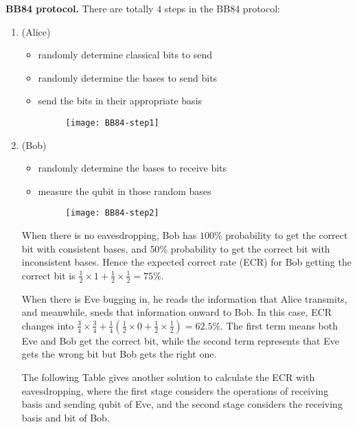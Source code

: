 \documentclass{easyclass}
\begin{document}
\textbf{BB84 protocol.} There are totally $4$ steps in the BB84 protocol:
\begin{enumerate}
	\item (Alice)
		\begin{itemize}
			\item randomly determine classical bits to send
			\item randomly determine the bases to send bits
			\item send the bits in their appropriate basis
			\begin{figure}[h]
				\centering
				\texttt{[image: BB84-step1]}
				\label{fig:BB84-step1}
			\end{figure}
		\end{itemize}
	\item (Bob)
		\begin{itemize}
			\item randomly determine the bases to receive bits
			\item measure the qubit in those random bases 
			\begin{figure}[h]
				\centering
				\texttt{[image: BB84-step2]}
				\label{fig:BB84-step2}
			\end{figure}
		\end{itemize}
		
		When there is no eavesdropping, Bob has $100\%$ probability to get the correct bit with consistent bases, and $50\%$ probability to get the correct bit with inconsistent bases. Hence the expected correct rate (ECR) for Bob getting the correct bit is $\frac{1}{2}\times 1+\frac{1}{2}\times\frac{1}{2}=75\%$.
		
		When there is Eve bugging in, he reads the information that Alice transmits, and meanwhile, sneds that information onward to Bob. In this case, ECR changes into $\frac{3}{4}\times \frac{3}{4}+\frac{1}{4}(\frac{1}{2}\times 0+\frac{1}{2}\times\frac{1}{2})=62.5\%$. The first term means both Eve and Bob get the correct bit, while the second term represents that Eve gets the wrong bit but Bob gets the right one. %

	    The following Table gives another solution to calculate the ECR with eavesdropping, where the first stage considers the operations of receiving basis and sending qubit of Eve, and the second stage considers the receiving basis and bit of Bob.
	    
	    \begin{table}[h]
		\hspace{10mm}
		\label{tab:ECR}
		\renewcommand\arraystretch{1.5}	
\end{table}
\end{enumerate}
\end{document}
